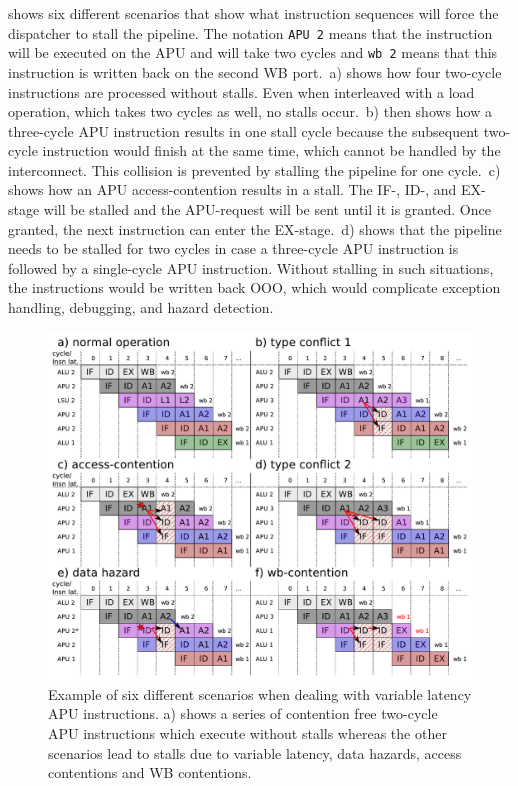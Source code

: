 \documentclass[%
 oneside,      %
 openany,      %
 halfparskip,  %
]{scrbook}
\begin{document}
 shows six different scenarios that show what instruction sequences will force the dispatcher to stall the pipeline. The notation \texttt{APU 2} means that the instruction will be executed on the APU and will take two cycles and \texttt{wb 2} means that this instruction is written back on the second WB port.
\,a) shows how four two-cycle instructions are processed without stalls. Even when interleaved with a load operation, which takes two cycles as well, no stalls occur. \,b) then shows how a three-cycle APU instruction results in one stall cycle because the subsequent two-cycle instruction would finish at the same time, which cannot be handled by the interconnect. This collision is prevented by stalling the pipeline for one cycle.
\,c) shows how an APU access-contention results in a stall. The IF-, ID-, and EX-stage will be stalled and the APU-request will be sent until it is granted. Once granted, the next instruction can enter the EX-stage. \,d) shows that the pipeline needs to be stalled for two cycles in case a three-cycle APU instruction is followed by a single-cycle APU instruction. Without stalling in such situations, the instructions would be written back OOO, which would complicate exception handling, debugging, and hazard detection.

\begin{figure}[t]
\centering
  \includegraphics[width=0.99\linewidth]{figures/insn_stream.pdf}
  \caption{Example of six different scenarios when dealing with variable latency APU instructions. a) shows a series of contention free two-cycle APU instructions which execute without stalls whereas the other scenarios lead to stalls due to variable latency, data hazards, access contentions and WB contentions.}
  \label{fig_apu:insn_stream}
\end{figure}
\end{document}
